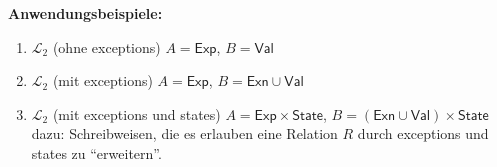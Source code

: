 \documentclass[12pt,a2paper,draft]{article}
\begin{document}
\noindent
\textbf{Anwendungsbeispiele:}
\begin{enumerate}
\item $\mathcal{L}_2$ (ohne exceptions) $A = \textsf{Exp}$, $B = \textsf{Val}$
\item $\mathcal{L}_2$ (mit exceptions) $A = \textsf{Exp}$, $B = \textsf{Exn} \cup \textsf{Val}$
\item $\mathcal{L}_2$ (mit exceptions und states) $A = \textsf{Exp} \times \textsf{State}$,
  $B = (\textsf{Exn} \cup \textsf{Val}) \times \textsf{State}$ \\
  dazu: Schreibweisen, die es erlauben eine Relation $R$ durch exceptions und states
  zu ``erweitern''.
\end{enumerate}

%
%
\end{document}
